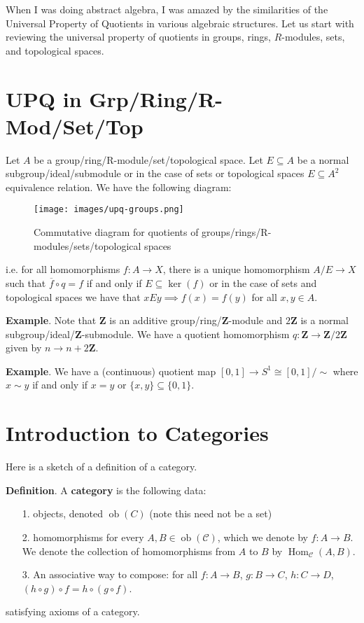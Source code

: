 \documentclass{memoir}
\begin{document}
When I was doing abstract algebra, I was amazed by the similarities of the Universal Property of Quotients in various algebraic structures. Let us start with reviewing the universal property of quotients in groups, rings, \(R\)-modules, sets, and topological spaces.

\chapter{UPQ in Grp/Ring/R-Mod/Set/Top}

Let \(A\) be a group/ring/R-module/set/topological space. Let \(E \subseteq A\) be a normal subgroup/ideal/submodule or in the case of sets or topological spaces \(E \subseteq A^2\) equivalence relation. We have the following diagram:

\begin{figure}
\centering
\texttt{[image: images/upq-groups.png]}
\caption{Commutative diagram for quotients of groups/rings/R-modules/sets/topological spaces}
\end{figure}


i.e. for all homomorphisms \(f : A \to X\),  there is a unique homomorphism \(A/E \to X\) such that \(\overline{f} \circ q = f\) if and only if \(E \subseteq \operatorname{ker}(f)\) or in the case of sets and topological spaces we have that \(x E y \implies f(x) = f(y)\) for all \(x,y \in A\).

\textbf{Example}. Note that \(\mathbf{Z}\) is an additive group/ring/\(\mathbf{Z}\)-module and \(2\mathbf{Z}\) is a normal subgroup/ideal/\(\mathbf{Z}\)-submodule. We have a quotient homomorphism \(q : \mathbf{Z} \to \mathbf{Z}/2\mathbf{Z}\) given by \(n \to n + 2\mathbf{Z}\).

\textbf{Example}. We have a (continuous) quotient map \([0,1] \to S^{1} \cong [0,1]/\sim\) where \(x \sim y\) if and only if \(x = y\) or \(\{x,y\} \subseteq \{0,1\}\).

\chapter{Introduction to Categories}

Here is a sketch of a definition of a category.

\textbf{Definition}. A \textbf{category} is the following data:

\begin{itemize}
\item[1. ] objects, denoted \(\operatorname{ob}(C)\) (note this need not be a set)


\item[2. ] homomorphisms for every \(A,B \in \operatorname{ob}(\mathcal{C})\), which we denote by \(f : A \to B\). We denote the collection of homomorphisms from \(A\) to \(B\) by \(\operatorname{Hom}_{\mathcal{C}}(A,B)\).


\item[3. ] An associative way to compose: for all \(f : A \to B\), \(g : B \to C\), \(h : C \to D\), \((h \circ g) \circ f = h \circ (g \circ f)\).

\end{itemize}
satisfying axioms of a category.
\end{document}
